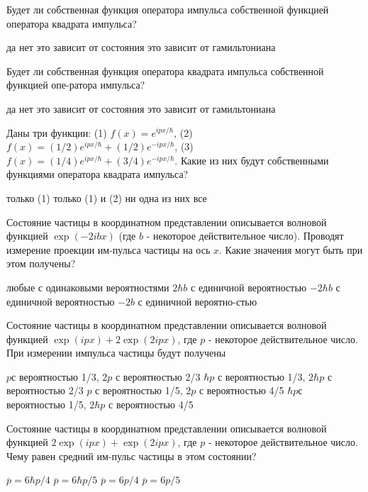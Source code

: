\documentclass[11pt,a4paper]{exam}
\begin{document}
\begin{questions}
\question Будет ли собственная функция оператора импульса собственной функцией оператора квадрата импульса?
\begin{choices}
\choice да     
\choice нет    
\choice это зависит от состояния    
\choice это зависит от гамильтониана
\end{choices}

\question Будет ли собственная функция оператора квадрата импульса собственной функцией опе-ратора импульса?
\begin{choices}
\choice да     
\choice нет    
\choice это зависит от состояния    
\choice это зависит от гамильтониана
\end{choices}

\question Даны три функции:
(1) $f(x) = {e^{ipx/\hbar }}$, (2) $f(x) = (1/2){e^{ipx/\hbar }} + (1/2){e^{ - ipx/\hbar }}$, (3) $f(x) = (1/4){e^{ipx/\hbar }} + (3/4){e^{ - ipx/\hbar }}$. 
Какие из них будут собственными функциями оператора квадрата импульса?
\begin{choices}
\choice только (1)      
\choice только (1) и (2)      
\choice ни одна из них     
\choice все
\end{choices}

\question Состояние частицы в координатном представлении описывается волновой функцией $\exp ( - 2ibx)$ (где $b$ - некоторое действительное число). Проводят измерение проекции им-пульса частицы на ось $x$. Какие значения могут быть при этом получены?
\begin{choices}
\choice любые с одинаковыми вероятностями          
\choice $2\hbar b$ с единичной вероятностью
\choice $ - 2\hbar b$ с единичной вероятностью        
\choice $ - 2b$ с единичной вероятно-стью
\end{choices}

\question Состояние частицы в координатном представлении описывается волновой функцией $\exp (ipx) + 2\exp (2ipx)$, где $p$ - некоторое действительное число. При измерении импульса частицы будут получены
\begin{choices}
\choice $p$с вероятностью 1/3, $2p$ с вероятностью 2/3
\choice $\hbar p$ с вероятностью 1/3, $2\hbar p$ с вероятностью 2/3
\choice $p$ с вероятностью 1/5, $2p$ с вероятностью 4/5  
\choice $\hbar p$с вероятностью 1/5, $2\hbar p$ с вероятностью 4/5
\end{choices}

\question Состояние частицы в координатном представлении описывается волновой функцией $2\exp (ipx) + \exp (2ipx)$, где $p$ - некоторое действительное число. Чему равен средний им-пульс частицы в этом состоянии?
\begin{choices}
\choice $\overline p  = 6\hbar p/4$    
\choice $\overline p  = 6\hbar p/5$    
\choice $\overline p  = 6p/4$    
\choice $\overline p  = 6p/5$ 
\end{choices}


\end{questions}
\end{document}
